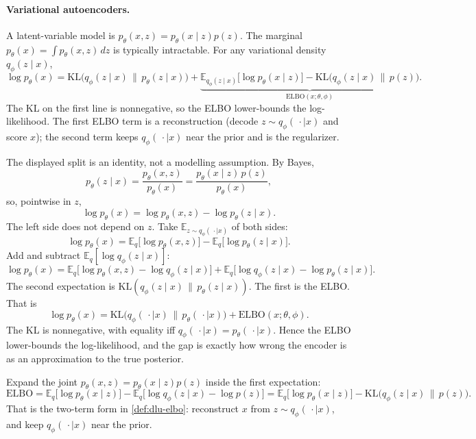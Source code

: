 \paragraph{Variational autoencoders.}

\begin{definition}[ELBO]
\label{def:dlu-elbo}
A latent-variable model is \(p_\theta(x,z)=p_\theta(x\mid z)p(z)\). The marginal \(p_\theta(x)=\int p_\theta(x,z)\,dz\) is typically intractable. For any variational density \(q_\phi(z\mid x)\),
\[
\log p_\theta(x)
=
\mathrm{KL}\bigl(q_\phi(z\mid x)\,\|\,p_\theta(z\mid x)\bigr)
+
\underbrace{\mathbb{E}_{q_\phi(z\mid x)}\bigl[\log p_\theta(x\mid z)\bigr]
-
\mathrm{KL}\bigl(q_\phi(z\mid x)\,\|\,p(z)\bigr)}_{\mathrm{ELBO}(x;\theta,\phi)}.
\]
The KL on the first line is nonnegative, so the ELBO lower-bounds the log-likelihood. The first ELBO term is a reconstruction (decode \(z\sim q_\phi(\,\cdot\mid x)\) and score \(x\)); the second term keeps \(q_\phi(\,\cdot\mid x)\) near the prior and is the regularizer.
\end{definition}

\begin{note}
\label{note:dlu-elbo-der}
The displayed split is an identity, not a modelling assumption. By Bayes,
\[
p_\theta(z\mid x)
=
\frac{p_\theta(x,z)}{p_\theta(x)}
=
\frac{p_\theta(x\mid z)\,p(z)}{p_\theta(x)},
\]
so, pointwise in \(z\),
\[
\log p_\theta(x)
=
\log p_\theta(x,z)
-
\log p_\theta(z\mid x).
\]
The left side does not depend on \(z\). Take \(\mathbb{E}_{z\sim q_\phi(\,\cdot\mid x)}\) of both sides:
\[
\log p_\theta(x)
=
\mathbb{E}_q\bigl[\log p_\theta(x,z)\bigr]
-
\mathbb{E}_q\bigl[\log p_\theta(z\mid x)\bigr].
\]
Add and subtract \(\mathbb{E}_q[\log q_\phi(z\mid x)]\):
\[
\log p_\theta(x)
=
\mathbb{E}_q\bigl[\log p_\theta(x,z)-\log q_\phi(z\mid x)\bigr]
+
\mathbb{E}_q\bigl[\log q_\phi(z\mid x)-\log p_\theta(z\mid x)\bigr].
\]
The second expectation is \(\mathrm{KL}(q_\phi(z\mid x)\,\|\,p_\theta(z\mid x))\). The first is the ELBO. That is
\[
\log p_\theta(x)
=
\mathrm{KL}\bigl(q_\phi(\,\cdot\mid x)\,\|\,p_\theta(\,\cdot\mid x)\bigr)
+
\mathrm{ELBO}(x;\theta,\phi).
\]
The KL is nonnegative, with equality iff \(q_\phi(\,\cdot\mid x)=p_\theta(\,\cdot\mid x)\). Hence the ELBO lower-bounds the log-likelihood, and the gap is exactly how wrong the encoder is as an approximation to the true posterior.

Expand the joint \(p_\theta(x,z)=p_\theta(x\mid z)p(z)\) inside the first expectation:
\[
\mathrm{ELBO}
=
\mathbb{E}_q\bigl[\log p_\theta(x\mid z)\bigr]
-
\mathbb{E}_q\bigl[\log q_\phi(z\mid x)-\log p(z)\bigr]
=
\mathbb{E}_q\bigl[\log p_\theta(x\mid z)\bigr]
-
\mathrm{KL}\bigl(q_\phi(z\mid x)\,\|\,p(z)\bigr).
\]
That is the two-term form in \cref{def:dlu-elbo}: reconstruct \(x\) from \(z\sim q_\phi(\,\cdot\mid x)\), and keep \(q_\phi(\,\cdot\mid x)\) near the prior.
\end{note}

